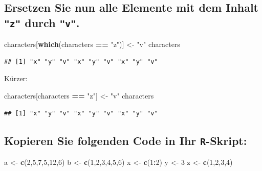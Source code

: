 \documentclass[12pt,a4paper]{article}
\newenvironment{Shaded}{\begin{snugshade}}{\end{snugshade}}
\newcommand{\DecValTok}[1]{\textcolor[rgb]{0.00,0.00,0.81}{#1}}
\newcommand{\FunctionTok}[1]{\textcolor[rgb]{0.13,0.29,0.53}{\textbf{#1}}}
\newcommand{\NormalTok}[1]{#1}
\newcommand{\OtherTok}[1]{\textcolor[rgb]{0.56,0.35,0.01}{#1}}
\newcommand{\SpecialCharTok}[1]{\textcolor[rgb]{0.81,0.36,0.00}{\textbf{#1}}}
\newcommand{\StringTok}[1]{\textcolor[rgb]{0.31,0.60,0.02}{#1}}
\begin{document}
\subsection{\texorpdfstring{Ersetzen Sie nun alle Elemente mit dem
Inhalt \texttt{"z"} durch
\texttt{"v"}.}{Ersetzen Sie nun alle Elemente mit dem Inhalt  durch .}}\label{ersetzen-sie-nun-alle-elemente-mit-dem-inhalt-durch-.}

\begin{Shaded}
\begin{Highlighting}[]
\NormalTok{    characters[}\FunctionTok{which}\NormalTok{(characters }\SpecialCharTok{==} \StringTok{"z"}\NormalTok{)] }\OtherTok{\textless{}{-}} \StringTok{"v"}
\NormalTok{    characters}
\end{Highlighting}
\end{Shaded}

\begin{verbatim}
## [1] "x" "y" "v" "x" "y" "v" "x" "y" "v"
\end{verbatim}

Kürzer:

\begin{Shaded}
\begin{Highlighting}[]
\NormalTok{    characters[characters }\SpecialCharTok{==} \StringTok{"z"}\NormalTok{] }\OtherTok{\textless{}{-}} \StringTok{"v"}
\NormalTok{    characters}
\end{Highlighting}
\end{Shaded}

\begin{verbatim}
## [1] "x" "y" "v" "x" "y" "v" "x" "y" "v"
\end{verbatim}

\vspace{0.5cm}

\subsection{\texorpdfstring{Kopieren Sie folgenden Code in Ihr
\texttt{R}-Skript:}{Kopieren Sie folgenden Code in Ihr -Skript:}}\label{kopieren-sie-folgenden-code-in-ihr--skript}

\begin{Shaded}
\begin{Highlighting}[]
\NormalTok{    a }\OtherTok{\textless{}{-}} \FunctionTok{c}\NormalTok{(}\DecValTok{2}\NormalTok{,}\DecValTok{5}\NormalTok{,}\DecValTok{7}\NormalTok{,}\DecValTok{5}\NormalTok{,}\DecValTok{12}\NormalTok{,}\DecValTok{6}\NormalTok{)}
\NormalTok{    b }\OtherTok{\textless{}{-}} \FunctionTok{c}\NormalTok{(}\DecValTok{1}\NormalTok{,}\DecValTok{2}\NormalTok{,}\DecValTok{3}\NormalTok{,}\DecValTok{4}\NormalTok{,}\DecValTok{5}\NormalTok{,}\DecValTok{6}\NormalTok{)}
\NormalTok{    x }\OtherTok{\textless{}{-}} \FunctionTok{c}\NormalTok{(}\DecValTok{1}\SpecialCharTok{:}\DecValTok{2}\NormalTok{)}
\NormalTok{    y }\OtherTok{\textless{}{-}} \DecValTok{3}
\NormalTok{    z }\OtherTok{\textless{}{-}} \FunctionTok{c}\NormalTok{(}\DecValTok{1}\NormalTok{,}\DecValTok{2}\NormalTok{,}\DecValTok{3}\NormalTok{,}\DecValTok{4}\NormalTok{)}
\end{Highlighting}
\end{Shaded}
\end{document}
